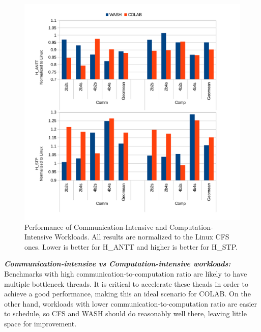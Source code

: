 \begin{figure}
\centering
\includegraphics[scale=0.55]{figures/com.pdf}
\vspace{-0.35cm}
\caption{Performance of Communication-Intensive and Computation-Intensive Workloads. All results are normalized to the Linux CFS ones. Lower is better for H\_ANTT and higher is better for H\_STP.}
\label{com}
\end{figure} 

\textbf{\textit{Communication-intensive vs Computation-intensive workloads:}}
Benchmarks with high communication-to-computation ratio are likely to have multiple bottleneck threads. It is critical to accelerate these theads in order to achieve a good performance, making this an ideal scenario for COLAB. On the other hand, workloads with lower communication-to-computation ratio are easier to schedule, so CFS and WASH should do reasonably well there, leaving little space for improvement.

